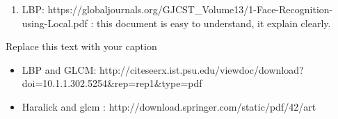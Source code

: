 \begin{enumerate}
\item LBP: https://globaljournals.org/GJCST_Volume13/1-Face-Recognition-using-Local.pdf : this document is easy to understand, it explain clearly.
\end{enumerate}Replace this text with your caption
\begin{itemize}
\item LBP and GLCM: http://citeseerx.ist.psu.edu/viewdoc/download?doi=10.1.1.302.5254&rep=rep1&type=pdf
\end{itemize}    
\begin{itemize}
\item Haralick and glcm : http://download.springer.com/static/pdf/42/art%
\end{itemize}

    